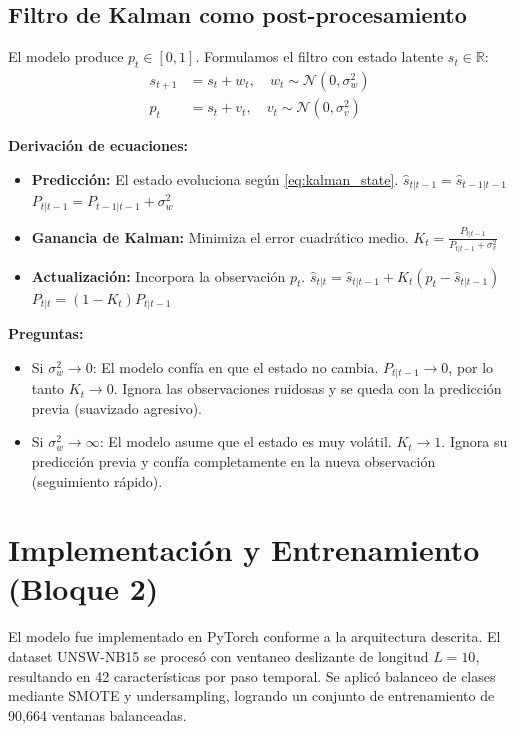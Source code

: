 \documentclass[12pt,a4paper]{article}
\begin{document}
\subsection{Filtro de Kalman como post-procesamiento}

El modelo produce $p_t \in [0,1]$. Formulamos el filtro con estado latente $s_t \in \mathbb{R}$:
\begin{align}
s_{t+1} &= s_t + w_t, \quad w_t \sim \mathcal{N}(0, \sigma_w^2) \label{eq:kalman_state} \\
p_t &= s_t + v_t, \quad v_t \sim \mathcal{N}(0, \sigma_v^2) \label{eq:kalman_obs}
\end{align}

\textbf{Derivación de ecuaciones:}
\begin{itemize}
    \item \textbf{Predicción:} El estado evoluciona según \eqref{eq:kalman_state}.
    $\hat{s}_{t|t-1} = \hat{s}_{t-1|t-1}$     $P_{t|t-1} = P_{t-1|t-1} + \sigma_w^2$     
    \item \textbf{Ganancia de Kalman:} Minimiza el error cuadrático medio.
    $K_t = \frac{P_{t|t-1}}{P_{t|t-1} + \sigma_v^2}$     
    \item \textbf{Actualización:} Incorpora la observación $p_t$.
    $\hat{s}_{t|t} = \hat{s}_{t|t-1} + K_t(p_t - \hat{s}_{t|t-1})$     $P_{t|t} = (1 - K_t)P_{t|t-1}$ \end{itemize}

\textbf{Preguntas:}
\begin{itemize}
    \item Si $\sigma_w^2 \to 0$: El modelo confía en que el estado no cambia. $P_{t|t-1} \to 0$, por lo tanto $K_t \to 0$. Ignora las observaciones ruidosas y se queda con la predicción previa (suavizado agresivo).
    \item Si $\sigma_w^2 \to \infty$: El modelo asume que el estado es muy volátil. $K_t \to 1$. Ignora su predicción previa y confía completamente en la nueva observación (seguimiento rápido).
\end{itemize}

\newpage
\section{Implementación y Entrenamiento (Bloque 2)}

El modelo fue implementado en PyTorch conforme a la arquitectura descrita. El dataset UNSW-NB15 se procesó con ventaneo deslizante de longitud $L=10$, resultando en 42 características por paso temporal. Se aplicó balanceo de clases mediante SMOTE y undersampling, logrando un conjunto de entrenamiento de 90,664 ventanas balanceadas. 
\end{document}

